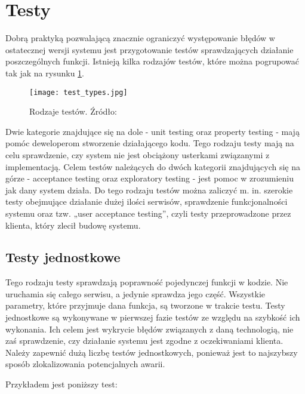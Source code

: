 \newpage
\section{Testy}

Dobrą praktyką pozwalającą znacznie ograniczyć występowanie błędów w ostatecznej 
wersji systemu jest przygotowanie testów sprawdzających działanie poszczególnych 
funkcji. Istnieją kilka rodzajów testów, które można pogrupować tak jak na rysunku
\ref{fig:test-types}.

\begin{figure}[h]
    \centering
    \texttt{[image: test\_types.jpg]}
    \caption{Rodzaje testów. Źródło: \cite{newman2015}}
    \label{fig:test-types}
\end{figure}

Dwie kategorie znajdujące się na dole - unit testing oraz property testing - mają 
pomóc deweloperom stworzenie działającego kodu. Tego rodzaju testy mają na celu 
sprawdzenie, czy system nie jest obciążony usterkami związanymi z implementacją. 
Celem testów należących do dwóch kategorii znajdujących się na górze - acceptance 
testing oraz exploratory testing - jest pomoc w zrozumieniu jak dany system działa. 
Do tego rodzaju testów można zaliczyć m. in. szerokie testy obejmujące działanie dużej 
ilości serwisów, sprawdzenie funkcjonalności systemu oraz tzw. „user acceptance 
testing”, czyli testy przeprowadzone przez klienta, który zlecił budowę systemu.

\subsection{Testy jednostkowe}

Tego rodzaju testy sprawdzają poprawność pojedynczej funkcji w kodzie. Nie uruchamia 
się całego serwisu, a jedynie sprawdza jego część. Wszystkie parametry, które 
przyjmuje dana funkcja, są tworzone w trakcie testu. Testy jednostkowe są wykonywane 
w pierwszej fazie testów ze względu na szybkość ich wykonania. Ich celem jest wykrycie 
błędów związanych z daną technologią, nie zaś sprawdzenie, czy działanie systemu jest 
zgodne z oczekiwaniami klienta. Należy zapewnić dużą liczbę testów 
jednostkowych, ponieważ jest to najszybszy sposób zlokalizowania potencjalnych awarii.

Przykładem jest poniższy test:

